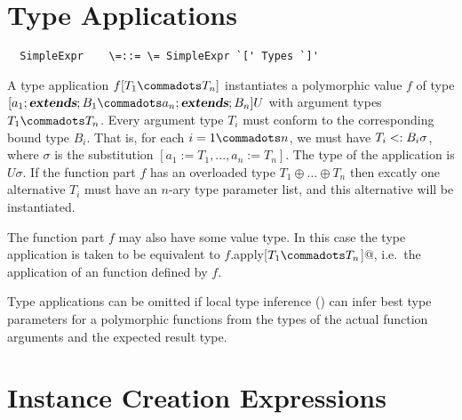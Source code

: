 \documentclass[11pt]{report}
\begin{document}

\section{Type Applications}
\label{sec:type-app}
\syntax\begin{verbatim}
  SimpleExpr    \=::= \= SimpleExpr `[' Types `]'
\end{verbatim}

A type application $f[T_1\commadots T_n]$ instantiates a polymorphic
value $f$ of type $[a_1 \extends B_1 \commadots a_n \extends B_n] U$ with
argument types $T_1 \commadots T_n$.  Every argument type $T_i$ must
conform to the corresponding bound type $B_i$. That is, for each $i = 1
\commadots n$, we must have $T_i <: B_i\sigma$, where $\sigma$ is
the substitution $[a_1 := T_1, ..., a_n := T_n]$.  The type of the
application is $U\sigma$.  If the function part $f$ has an overloaded
type $T_1 \oplus \ldots \oplus T_n$ then excatly one alternative
$T_i$ must have an $n$-ary type parameter list, and this alternative
will be instantiated.

The function part $f$ may also have some value type. In this case the
type application is taken to be equivalent to
\verb@$f$.apply[$T_1\commadots T_n$]@,
i.e.\ the application of an \verb@apply@ function defined by $f$.

Type applications can be omitted if local type inference
() can infer best type parameters for a
polymorphic functions from the types of the actual function arguments
and the expected result type.

\section{Instance Creation Expressions}
\label{sec:inst-creation}
\end{document}
